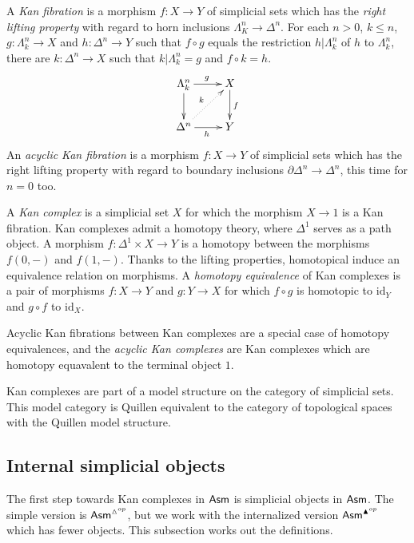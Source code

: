 \documentclass{amsart}
\theoremstyle{plain}
\theoremstyle{definition}
\newcommand\hide[1]{}
\newcommand\id{\mathrm{id}}
\begin{document}
A \emph{Kan fibration} is a morphism $f:X\to Y$ of simplicial sets which has the \emph{right lifting property} with regard to horn inclusions $\Lambda^n_K\to\Delta^n$. For each $n>0$, $k\leq n$, $g:\Lambda^n_k\to X$ and $h:\Delta^n \to Y$ such that $f\circ g$ equals the restriction $h|\Lambda^n_k$ of $h$ to $\Lambda^n_k$, there are $k:\Delta^n\to X$ such that $k|\Lambda^n_k = g$ and $f\circ k = h$.
\[ \xymatrix{
\Lambda^n_k \ar[d] \ar[r]^g & X\ar[d]^f\\
\Delta^n \ar[r]_h\ar@{.>}[ur]^k & Y
}\]
An \emph{acyclic Kan fibration} is a morphism $f:X\to Y$ of simplicial sets which has the right lifting property with regard to boundary inclusions $\partial \Delta^n\to\Delta^n$, this time for $n=0$ too. 

A \emph{Kan complex} is a simplicial set $X$ for which the morphism $X\to 1$ is a Kan fibration. Kan complexes admit a homotopy theory, where $\Delta^1$ serves as a path object. A morphism $f:\Delta^1\times X\to Y$ is a homotopy between the morphisms $f(0,-)$ and $f(1,-)$. Thanks to the lifting properties, homotopical induce an equivalence relation on morphisms. A \emph{homotopy equivalence} of Kan complexes is a pair of morphisms $f:X\to Y$ and $g:Y\to X$ for which $f\circ g$ is homotopic to $\id_Y$ and $g\circ f$ to $\id_X$. 

Acyclic Kan fibrations between Kan complexes are a special case of homotopy equivalences, and the \emph{acyclic Kan complexes} are Kan complexes which are homotopy equavalent to the terminal object $1$.%

Kan complexes are part of a model structure on the category of simplicial sets. This model category is Quillen equivalent to the category of topological spaces with the Quillen model structure. \hide{cite: Hovey, Goerss Jardine, etc.?}

\subsection{Internal simplicial objects}
The first step towards Kan complexes in $\mathsf{Asm}$ is simplicial objects in $\mathsf{Asm}$. The simple version is $\mathsf{Asm}^{\vartriangle^{op}}$, but we work with the internalized version $\mathsf{Asm}^{\blacktriangle^{op}}$ which has fewer objects. This subsection works out the definitions. \hide{alles beschreven in M\&M, citeren dus}
\end{document}

